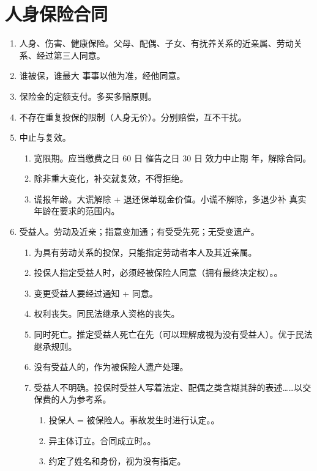 \section{人身保险合同}
\begin{enumerate}
  \item 人身、伤害、健康保险。父母、配偶、子女、有抚养关系的近亲属、劳动关系、经过第三人同意。
  \item 谁被保，谁最大 \yjt 事事以他为准，经他同意。
  \item 保险金的定额支付。多买多赔原则。
  \item 不存在重复投保的限制（人身无价）。分别赔偿，互不干扰。
  \item 中止与复效。
        \begin{enumerate}
          \item 宽限期。应当缴费之日 60 日 \hz 催告之日 30 日 \yjt 效力中止期  年，解除合同。
          \item 除非重大变化，补交就复效，不得拒绝。
          \item 谎报年龄。大谎解除 + 退还保单现金价值。小谎不解除，多退少补 \yjt 真实年龄在要求的范围内。
        \end{enumerate}
  \item 受益人。劳动及近亲；指意变加通；有受受先死；无受变遗产。
        \begin{enumerate}
          \item 为具有劳动关系的投保，只能指定劳动者本人及其近亲属。
          \item 投保人指定受益人时，必须经被保险人同意（拥有最终决定权）。。
          \item 变更受益人要经过通知 + 同意。
          \item 权利丧失。同民法继承人资格的丧失。
          \item 同时死亡。推定受益人死亡在先（可以理解成视为没有受益人）。优于民法继承规则。
          \item 没有受益人的，作为被保险人遗产处理。
          \item 受益人不明确。投保时受益人写着法定、配偶之类含糊其辞的表述……以交保费的人为参考系。
                \begin{enumerate}
                  \item 投保人 = 被保险人。事故发生时进行认定。。
                  \item 异主体订立。合同成立时。。
                  \item 约定了姓名和身份，视为没有指定。

\end{enumerate}
\end{enumerate}
\end{enumerate}
